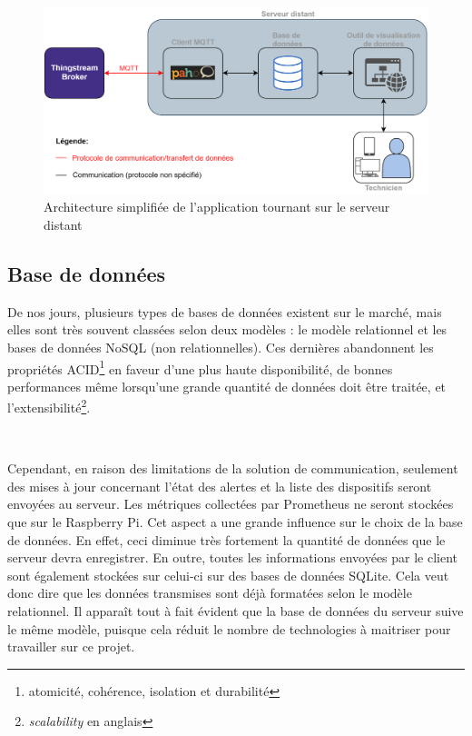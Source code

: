 \begin{figure}[ht!]
  \centering
  \includegraphics[width=\textwidth]{img/app/base_server.png}
  \caption{Architecture simplifiée de l'application tournant sur le serveur distant}
  \label{fig:base_server}
\end{figure}


\subsection{Base de données}

\noindent
De nos jours, plusieurs types de bases de données existent sur le marché, mais elles sont très souvent classées selon deux modèles : le modèle relationnel et les bases de données NoSQL (non relationnelles). Ces dernières abandonnent les propriétés ACID\footnote{atomicité, cohérence, isolation et durabilité} en faveur d'une plus haute disponibilité, de bonnes performances même lorsqu'une grande quantité de données doit être traitée, et l'extensibilité\footnote{\textit{scalability} en anglais}.

~

\noindent
Cependant, en raison des limitations de la solution de communication, seulement des mises à jour concernant l'état des alertes et la liste des dispositifs seront envoyées au serveur. Les métriques collectées par Prometheus ne seront stockées que sur le Raspberry Pi. Cet aspect a une grande influence sur le choix de la base de données. En effet, ceci diminue très fortement la quantité de données que le serveur devra enregistrer. En outre, toutes les informations envoyées par le client sont également stockées sur celui-ci sur des bases de données SQLite. Cela veut donc dire que les données transmises sont déjà formatées selon le modèle relationnel. Il apparaît tout à fait évident que la base de données du serveur suive le même modèle, puisque cela réduit le nombre de technologies à maitriser pour travailler sur ce projet.

